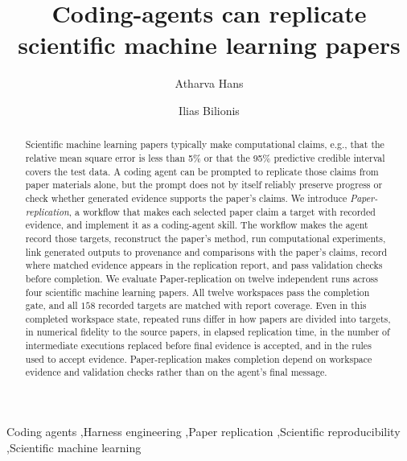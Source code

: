 \documentclass[authoryear,5p,times,nopreprintline]{elsarticle}
\begin{document}
\begin{frontmatter}

\title{Coding-agents can replicate scientific machine learning papers}

\author[aff1]{Atharva Hans}

\author[aff1]{Ilias Bilionis}




\begin{abstract}
Scientific machine learning papers typically make computational claims, e.g., that the relative mean square error is less than 5\% or that the 95\% predictive credible interval covers the test data.
A coding agent can be prompted to replicate those claims from paper materials alone, but the prompt does not by itself reliably preserve progress or check whether generated evidence supports the paper's claims.
We introduce \emph{Paper-replication}, a workflow that makes each selected paper claim a target with recorded evidence, and implement it as a coding-agent skill.
The workflow makes the agent record those targets, reconstruct the paper's method, run computational experiments, link generated outputs to provenance and comparisons with the paper's claims, record where matched evidence appears in the replication report, and pass validation checks before completion.
We evaluate Paper-replication on twelve independent runs across four scientific machine learning papers.
All twelve workspaces pass the completion gate, and all \(158\) recorded targets are matched with report coverage.
Even in this completed workspace state, repeated runs differ in how papers are divided into targets, in numerical fidelity to the source papers, in elapsed replication time, in the number of intermediate executions replaced before final evidence is accepted, and in the rules used to accept evidence.
Paper-replication makes completion depend on workspace evidence and validation checks rather than on the agent's final message.
\end{abstract}

\begin{keyword}
Coding agents \sep Harness engineering \sep Paper replication \sep Scientific reproducibility \sep Scientific machine learning
\end{keyword}

\end{frontmatter}
\end{document}
